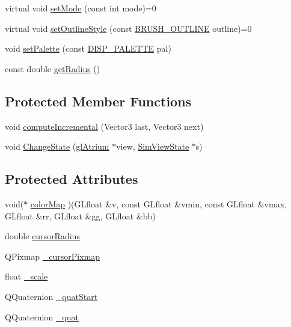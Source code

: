 \begin{DoxyCompactItemize}
\item 
virtual void \hyperlink{class_sim_view_state_a974327508e13018d05da02b3bce08615}{set\+Mode} (const int mode)=0
\item 
virtual void \hyperlink{class_sim_view_state_ab564f25312c081a619efd4e7619b68d1}{set\+Outline\+Style} (const \hyperlink{_sim_view_state_8h_a64cb6e33858a4b9db209712bab2f0e99}{B\+R\+U\+S\+H\+\_\+\+O\+U\+T\+L\+I\+N\+E} outline)=0
\item 
void \hyperlink{class_sim_view_state_a6f4914ea9b1dcdee9657d5d58b553a36}{set\+Palette} (const \hyperlink{_sim_view_state_8h_aac0f40b4af712e3b80d1b769cb0161d3}{D\+I\+S\+P\+\_\+\+P\+A\+L\+E\+T\+T\+E} pal)
\item 
const double \hyperlink{class_sim_view_state_ac07366dc45e2bf517d896df7fd791a2b}{get\+Radius} ()
\end{DoxyCompactItemize}
\subsection*{Protected Member Functions}
\begin{DoxyCompactItemize}
\item 
void \hyperlink{class_sim_view_state_adc4b5690cdd73f8b624b86ff18cc088d}{compute\+Incremental} (Vector3 last, Vector3 next)
\item 
void \hyperlink{class_sim_view_state_a272419ea4de89cc111205ebde1c8c820}{Change\+State} (\hyperlink{classgl_atrium}{gl\+Atrium} $\ast$view, \hyperlink{class_sim_view_state}{Sim\+View\+State} $\ast$s)
\end{DoxyCompactItemize}
\subsection*{Protected Attributes}
\begin{DoxyCompactItemize}
\item 
void($\ast$ \hyperlink{class_sim_view_state_ae589ccbf8ab7a064c2ea7d48d5c8bd24}{color\+Map} )(G\+Lfloat \&v, const G\+Lfloat \&vmin, const G\+Lfloat \&vmax, G\+Lfloat \&rr, G\+Lfloat \&gg, G\+Lfloat \&bb)
\item 
double \hyperlink{class_sim_view_state_aa8c58229562ab48c746b601ee18c547f}{cursor\+Radius}
\item 
Q\+Pixmap \hyperlink{class_sim_view_state_a81d972d69bb9faeadad77688cc1d8c41}{\+\_\+cursor\+Pixmap}
\item 
float \hyperlink{class_sim_view_state_a51600cc462d6a280685873259d00afc8}{\+\_\+scale}
\item 
Q\+Quaternion \hyperlink{class_sim_view_state_aac7dea4f3ebe5c8b8ef3bec00d375ee1}{\+\_\+quat\+Start}
\item 
Q\+Quaternion \hyperlink{class_sim_view_state_aeac9ae8a7ccf8c76c14c87eda4c3ebb7}{\+\_\+quat}
\end{DoxyCompactItemize}


